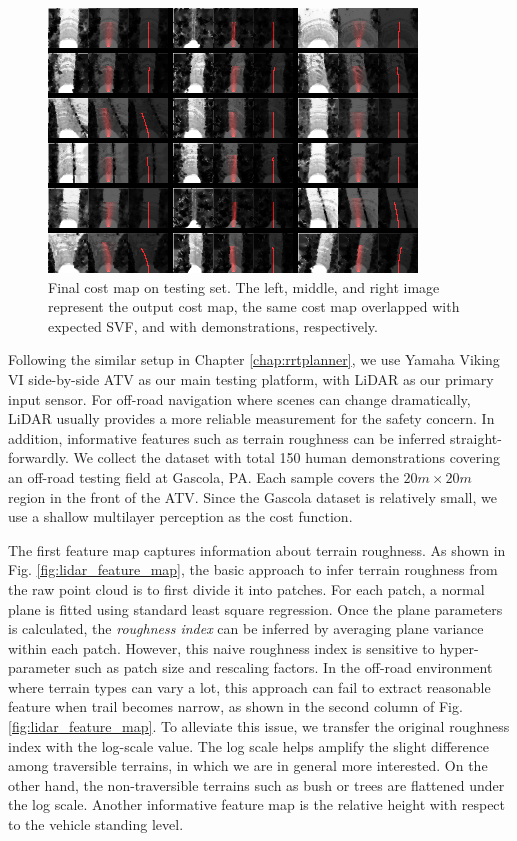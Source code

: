 \documentclass[../thesis.tex]{subfiles}
\begin{document}
\begin{figure}[t]
    	\begin{center}
    	 \centerline{\includegraphics[width=0.8\columnwidth]{./DIRL/fig/gradtestImg040.png}}
           	\caption{Final cost map on testing set. The left, middle, and right image represent the output cost map, the same cost map overlapped with expected SVF, and with demonstrations, respectively.}
           	\label{fig:final_cost_map}
    	\end{center}
\end{figure}
 
Following the similar setup in Chapter \ref{chap:rrtplanner}, we use Yamaha Viking VI side-by-side ATV as our main testing platform, with LiDAR as our primary input sensor.
For off-road navigation where scenes can change dramatically, LiDAR usually provides a more reliable measurement for the safety concern.
In addition, informative features such as terrain roughness can be inferred straight-forwardly.
We collect the dataset with total 150 human demonstrations covering an off-road testing field at Gascola, PA. Each sample covers the $20m \times 20m$ region in the front of the ATV. Since the Gascola dataset is relatively small, we use a shallow multilayer perception as the cost function.
 
The first feature map captures information about terrain roughness.
As shown in Fig. \ref{fig:lidar_feature_map}, the basic approach to infer terrain roughness from the raw point cloud is to first divide it into patches.
For each patch, a normal plane is fitted using standard least square regression.
Once the plane parameters is calculated, the \textit{roughness index} can be inferred by averaging plane variance within each patch.
However, this naive roughness index is sensitive to hyper-parameter such as patch size and rescaling factors.
In the off-road environment where terrain types can vary a lot, this approach can fail to extract reasonable feature when trail becomes narrow, as shown in the second column of Fig. \ref{fig:lidar_feature_map}.
To alleviate this issue, we transfer the original roughness index with the log-scale value.
The log scale helps amplify the slight difference among traversible terrains, in which we are in general more interested.
On the other hand, the non-traversible terrains such as bush or trees are flattened under the log scale.
Another informative feature map is the relative height with respect to the vehicle standing level.
 
\end{document}
